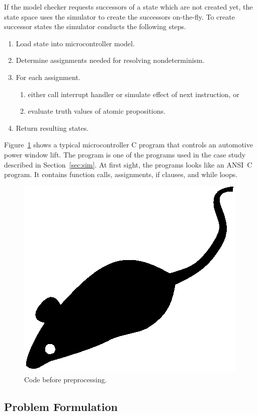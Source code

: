 If the model checker requests successors of a state which are not
created yet, the state space uses the simulator to create the
successors on-the-fly. To create successor states the simulator
conducts the following steps.
\begin{enumerate}
\item Load state into microcontroller model.
\item Determine assignments needed for resolving nondeterminism.
\item For each assignment.
      \begin{enumerate}
      \item either call interrupt handler or simulate effect of next instruction, or
      \item evaluate truth values of atomic propositions.
      \end{enumerate}
\item Return resulting states.
\end{enumerate}
Figure~\ref{fig:one} shows a typical microcontroller C program that
controls an automotive power window lift. The program is one of the
programs used in the case study described in Section~\ref{sec:sim}.
At first sight, the programs looks like an ANSI~C program. It
contains function calls, assignments, if clauses, and while loops.
\begin{figure}
  \includegraphics{mouse}
  \caption{Code before preprocessing.}
  \label{fig:one}
\end{figure}

\subsection{Problem Formulation}


